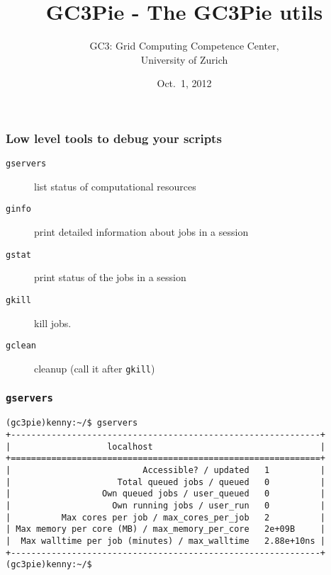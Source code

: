 \documentclass[english,serif,mathserif,xcolor=pdftex,dvipsnames,table]{beamer}
\title[GC3Utils]{%
GC3Pie - The GC3Pie utils
}
\author[Antonio Messina]{%
  GC3: Grid Computing Competence Center, \\
  University of Zurich
}
\date{Oct.~1, 2012}
\begin{document}
\maketitle

\begin{frame}[fragile]
  \frametitle{Low level tools to debug your scripts}
  \begin{description}
  \item[\texttt{gservers}] list status of computational resources
  \item[\texttt{ginfo}] print detailed information about jobs in a session
  \item[\texttt{gstat}] print status of the jobs in a session
  \item[\texttt{gkill}] kill jobs.
  \item[\texttt{gclean}] cleanup (call it after \lstinline|gkill|)
  \end{description}
\end{frame}

\begin{frame}[fragile]
  \frametitle{\texttt{gservers}}
  \begin{lstlisting}[basicstyle=\tt\tiny]
(gc3pie)kenny:~/$ gservers
+-------------------------------------------------------------+
|                   localhost                                 |
+=============================================================+
|                          Accessible? / updated   1          |
|                     Total queued jobs / queued   0          |
|                  Own queued jobs / user_queued   0          |
|                    Own running jobs / user_run   0          |
|          Max cores per job / max_cores_per_job   2          |
| Max memory per core (MB) / max_memory_per_core   2e+09B     |
|  Max walltime per job (minutes) / max_walltime   2.88e+10ns |
+-------------------------------------------------------------+
(gc3pie)kenny:~/$
  \end{lstlisting}
\end{frame}
\end{document}
